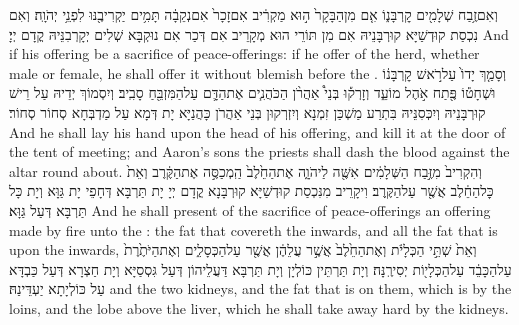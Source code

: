 \newperek
{}
{וְאִם\maqqaf זֶ֥בַח שְׁלָמִ֖ים קׇרְבָּנ֑וֹ אִ֤ם מִן\maqqaf הַבָּקָר֙ ה֣וּא מַקְרִ֔יב אִם\maqqaf זָכָר֙ אִם\maqqaf נְקֵבָ֔ה תָּמִ֥ים יַקְרִיבֶ֖נּוּ לִפְנֵ֥י יְהֹוָֽה׃}
{וְאִם נִכְסַת קוּדְשַׁיָּא קוּרְבָּנֵיהּ אִם מִן תּוֹרֵי הוּא מְקָרֵיב אִם דְּכַר אִם נוּקְבָּא שְׁלִים יְקָרְבִנֵּיהּ קֳדָם יְיָ׃}
{And if his offering be a sacrifice of peace-offerings: if he offer of the herd, whether male or female, he shall offer it without blemish before the \lord.}{}
{וְסָמַ֤ךְ יָדוֹ֙ עַל\maqqaf רֹ֣אשׁ קׇרְבָּנ֔וֹ וּשְׁחָט֕וֹ פֶּ֖תַח אֹ֣הֶל מוֹעֵ֑ד וְזָרְק֡וּ בְּנֵי֩ אַהֲרֹ֨ן הַכֹּהֲנִ֧ים אֶת\maqqaf הַדָּ֛ם עַל\maqqaf הַמִּזְבֵּ֖חַ סָבִֽיב׃}
{וְיִסְמוֹךְ יְדֵיהּ עַל רֵישׁ קוּרְבָּנֵיהּ וְיִכְּסִנֵּיהּ בִּתְרַע מַשְׁכַּן זִמְנָא וְיִזְרְקוּן בְּנֵי אַהֲרֹן כָּהֲנַיָּא יָת דְּמָא עַל מַדְבְּחָא סְחוֹר סְחוֹר׃}
{And he shall lay his hand upon the head of his offering, and kill it at the door of the tent of meeting; and Aaron’s sons the priests shall dash the blood against the altar round about.}{}
{וְהִקְרִיב֙ מִזֶּ֣בַח הַשְּׁלָמִ֔ים אִשֶּׁ֖ה לַיהֹוָ֑ה אֶת\maqqaf הַחֵ֙לֶב֙ הַֽמְכַסֶּ֣ה אֶת\maqqaf הַקֶּ֔רֶב וְאֵת֙ כׇּל\maqqaf הַחֵ֔לֶב אֲשֶׁ֖ר עַל\maqqaf הַקֶּֽרֶב׃}
{וִיקָרֵיב מִנִּכְסַת קוּדְשַׁיָּא קוּרְבָּנָא קֳדָם יְיָ יָת תַּרְבָּא דְּחָפֵי יָת גַּוָּא וְיָת כָּל תַּרְבָּא דְּעַל גַּוָּא׃}
{And he shall present of the sacrifice of peace-offerings an offering made by fire unto the \lord: the fat that covereth the inwards, and all the fat that is upon the inwards,}{}
{וְאֵת֙ שְׁתֵּ֣י הַכְּלָיֹ֔ת וְאֶת\maqqaf הַחֵ֙לֶב֙ אֲשֶׁ֣ר עֲלֵהֶ֔ן אֲשֶׁ֖ר עַל\maqqaf הַכְּסָלִ֑ים וְאֶת\maqqaf הַיֹּתֶ֙רֶת֙ עַל\maqqaf הַכָּבֵ֔ד עַל\maqqaf הַכְּלָי֖וֹת יְסִירֶֽנָּה׃}
{וְיָת תַּרְתֵּין כּוֹלְיָן וְיָת תַּרְבָּא דַּעֲלֵיהוֹן דְּעַל גִּסְסַיָּא וְיָת חַצְרָא דְּעַל כַּבְדָּא עַל כּוֹלְיָתָא יַעְדֵּינַהּ׃}
{and the two kidneys, and the fat that is on them, which is by the loins, and the lobe above the liver, which he shall take away hard by the kidneys.}{}
